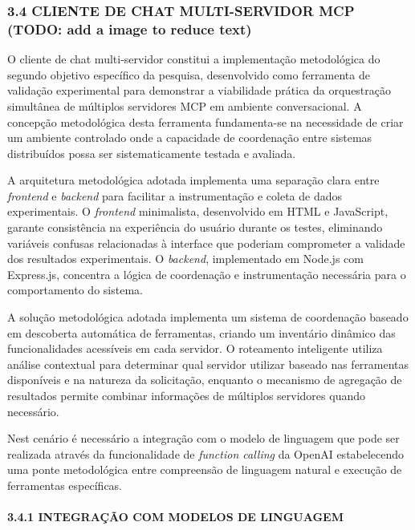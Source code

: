 \documentclass[
]{article}
\begin{document}
\subsubsection{3.4 CLIENTE DE CHAT MULTI-SERVIDOR MCP (TODO: add a image
to reduce
text)}\label{cliente-de-chat-multi-servidor-mcp-todo-add-a-image-to-reduce-text}

O cliente de chat multi-servidor constitui a implementação metodológica
do segundo objetivo específico da pesquisa, desenvolvido como ferramenta
de validação experimental para demonstrar a viabilidade prática da
orquestração simultânea de múltiplos servidores MCP em ambiente
conversacional. A concepção metodológica desta ferramenta fundamenta-se
na necessidade de criar um ambiente controlado onde a capacidade de
coordenação entre sistemas distribuídos possa ser sistematicamente
testada e avaliada.

A arquitetura metodológica adotada implementa uma separação clara entre
\emph{frontend} e \emph{backend} para facilitar a instrumentação e
coleta de dados experimentais. O \emph{frontend} minimalista,
desenvolvido em HTML e JavaScript, garante consistência na experiência
do usuário durante os testes, eliminando variáveis confusas relacionadas
à interface que poderiam comprometer a validade dos resultados
experimentais. O \emph{backend}, implementado em Node.js com Express.js,
concentra a lógica de coordenação e instrumentação necessária para o
comportamento do sistema.

A solução metodológica adotada implementa um sistema de coordenação
baseado em descoberta automática de ferramentas, criando um inventário
dinâmico das funcionalidades acessíveis em cada servidor. O roteamento
inteligente utiliza análise contextual para determinar qual servidor
utilizar baseado nas ferramentas disponíveis e na natureza da
solicitação, enquanto o mecanismo de agregação de resultados permite
combinar informações de múltiplos servidores quando necessário.

Nest cenário é necessário a integração com o modelo de linguagem que
pode ser realizada através da funcionalidade de \emph{function calling}
da OpenAI estabelecendo uma ponte metodológica entre compreensão de
linguagem natural e execução de ferramentas específicas.

\paragraph{3.4.1 INTEGRAÇÃO COM MODELOS DE
LINGUAGEM}\label{integrauxe7uxe3o-com-modelos-de-linguagem}
\end{document}
